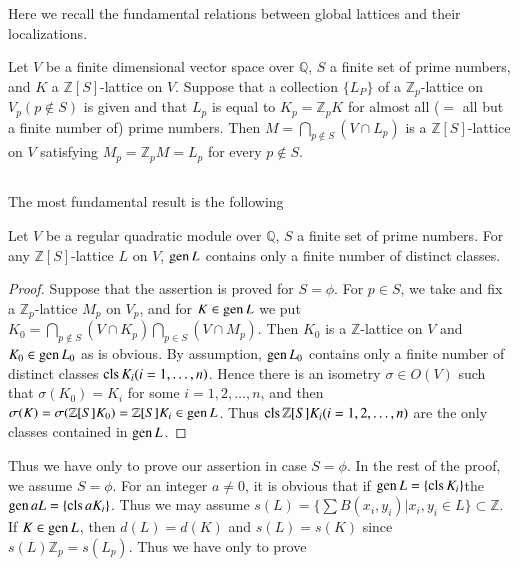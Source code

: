 Here we recall the fundamental relations between global lattices and
their localizations.

\begin{theorem}\label{c2:thm-2.23}
Let $V$ be a finite dimensional vector space over $\mathbb{Q}$, $S$ a
finite set of prime numbers, and $K$ a $\mathbb{Z}[S]$-lattice on
$V$. Suppose that a collection $\{L_{P}\}$ of a
$\mathbb{Z}_{p}$-lattice on $V_{p}(p\not\in S)$ is given and that
$L_{p}$ is equal to $K_{p}=\mathbb{Z}_{p}K$ for almost all ($=$ all
but a finite number of) prime numbers. Then
$M=\bigcap\limits_{p\not\in S}(V\cap L_{p})$ is a
$\mathbb{Z}[S]$-lattice on $V$ satisfying
$M_{p}=\mathbb{Z}_{p}M=L_{p}$ for every $p\not\in S$.
\end{theorem}

\subsection{}\label{c2:subsec2.4.1}

The most fundamental result is the following

\begin{theorem}\label{c2:thm-2.24}
Let $V$ be a regular quadratic module over $\mathbb{Q}$, $S$ a finite
set of prime numbers. For any $\mathbb{Z}[S]$-lattice $L$ on $V$,
$\operatorname{gen} L$ contains only a finite number of distinct classes.
\end{theorem}

\begin{proof}
Suppose that the assertion is proved for $S=\phi$. For $p\in S$, we
take and fix a $\mathbb{Z}_{p}$-lattice $M_{p}$ on $V_{p}$, and for
$K\in\operatorname{gen} L$ we put $K_{0}=\bigcap\limits_{p \not\in S}(V\cap
K_{p})\bigcap\limits_{p\in S}(V\cap M_{p})$. Then $K_{0}$ is a
$\mathbb{Z}$-lattice on $V$ and $K_{0}\in\operatorname{gen} L_{0}$ as is obvious. By
assumption, $\operatorname{gen} L_{0}$ contains only a finite number of distinct
classes $\operatorname{cls} K_{i}(i=1,\ldots,n)$. Hence there is an isometry
$\sigma\in O(V)$ such that $\sigma(K_{0})=K_{i}$ for some
$i=1,2,\ldots,n$, and then
$\sigma(K)=\sigma(\mathbb{Z}[S]K_{0})=\mathbb{Z}[S]K_{i}\in\operatorname{gen}
L$. Thus $\operatorname{cls}\mathbb{Z}[S]K_{i}(i=1,2,\ldots,n)$ are the only classes
contained in $\operatorname{gen} L$.
\end{proof}

Thus we have only to prove our assertion in case $S=\phi$. In the rest
of the proof, we assume $S=\phi$. For an integer $a\neq 0$, it is
obvious that if $\operatorname{gen} L=\{\operatorname{cls} K_{i}\}$\pageoriginale the $\operatorname{gen}
aL=\{\operatorname{cls} aK_{i}\}$. Thus we may assume $s(L)=\{\sum
B(x_{i},y_{i})|x_{i},y_{i}\in L\}\subset \mathbb{Z}$. If $K\in\operatorname{gen} L$,
then $d(L)=d(K)$ and $s(L)=s(K)$ since
$s(L)\mathbb{Z}_{p}=s(L_{p})$. Thus we have only to prove


